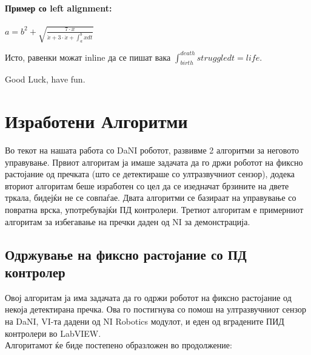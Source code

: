 \documentclass{article}
\begin{document}
\paragraph{Пример со left alignment:}
\begin{flushleft}
$ a = b^2 + \sqrt{\frac{7 \cdot x}{{\ddot x + 3 \cdot \dot x + \int_a^b{x dt}}}} $
\end{flushleft}

Исто, равенки можат inline да се пишат вака $\int_{birth}^{death}{struggle dt} = life $.

Good Luck, have fun.
\newpage
\section{Изработени Алгоритми}
Во текот на нашата работа со DaNI роботот, развивме 2 алгоритми за неговото управување. Првиот алгоритам ја имаше задачата да го држи роботот на фиксно растојание од пречката (што се детектираше со ултразвучниот сензор), додека вториот алгоритам беше изработен со цел да се изедначат брзините на двете тркала, бидејќи не се совпаѓае. Двата алгоритми се базираат на управување со повратна врска, употребувајќи ПД контролери. Третиот алгоритам е примерниот алгоритам за избегавање на пречки даден од NI за демонстрација. 

\subsection{Одржување на фиксно растојание со ПД контролер}
Овој алгоритам ја има задачата да го одржи роботот на фиксно растојание од некоја детектирана пречка. Ова го постигнува со помош на ултразвучниот сензор на DaNI, VI-та дадени од NI Robotics модулот, и еден од вградените ПИД контролери во LabVIEW.\\ Алгоритамот ќе биде постепено образложен во продолжение:
\end{document}
